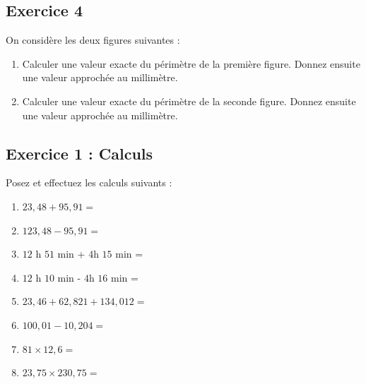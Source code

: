 \documentclass[14pt]{extreport}
\theoremstyle{plain}
\begin{document}
    \subsection*{Exercice 4}
On considère les deux figures suivantes : 

\begin{figure}[H]
\center 
{}
\end{figure} 
\begin{enumerate}
\item Calculer une valeur exacte du périmètre de la première figure. Donnez ensuite une valeur approchée au millimètre. 

\item Calculer une valeur exacte du périmètre de la seconde figure. Donnez ensuite une valeur approchée au millimètre. 
\end{enumerate} 
 
 
 \newpage
 
\subsection*{Exercice 1 : Calculs}  %


Posez et effectuez les calculs suivants : 
\begin{enumerate}
\item $23,48 + 95, 91 = $
\item $123,48 - 95, 91 = $
\item $12$ h $51$ min + $4$h $15$ min = 
\item $12$ h $10$ min - $4$h $16$ min =
\item $23,46 + 62, 821 + 134,012 = $
\item $100,01 - 10, 204 =  $
\item $81 \times 12,6 = $
\item $ 23,75 \times 230,75 = $
\end{enumerate}
\end{document}
